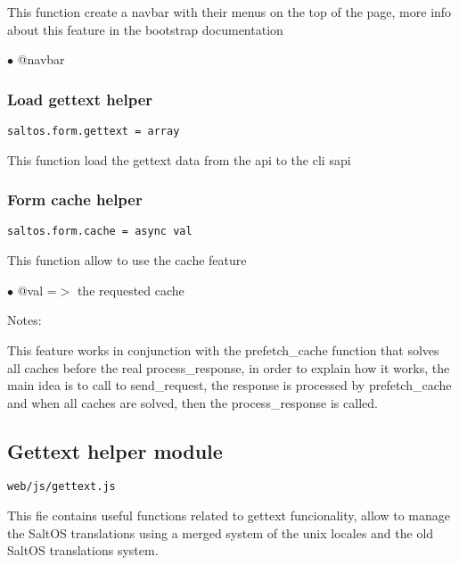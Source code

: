 \documentclass[a4paper]{article}
\begin{document}
This function create a navbar with their menus on the top of the page, more
info about this feature in the bootstrap documentation

\begin{compactitem}
\item[\color{myblue}$\bullet$] @navbar
\end{compactitem}

\hypertarget{toc791}{}
\subsubsection{Load gettext helper}

\begin{lstlisting}
saltos.form.gettext = array
\end{lstlisting}

This function load the gettext data from the api to the cli sapi

\hypertarget{toc792}{}
\subsubsection{Form cache helper}

\begin{lstlisting}
saltos.form.cache = async val
\end{lstlisting}

This function allow to use the cache feature

\begin{compactitem}
\item[\color{myblue}$\bullet$] @val =$>$ the requested cache
\end{compactitem}

Notes:

This feature works in conjunction with the prefetch\_cache function that
solves all caches before the real process\_response, in order to explain
how it works, the main idea is to call to send\_request, the response is
processed by prefetch\_cache and when all caches are solved, then the
process\_response is called.

\hypertarget{toc793}{}
\subsection{Gettext helper module}

\begin{lstlisting}
web/js/gettext.js
\end{lstlisting}

This fie contains useful functions related to gettext funcionality, allow to manage the
SaltOS translations using a merged system of the unix locales and the old SaltOS translations
system.
\end{document}
